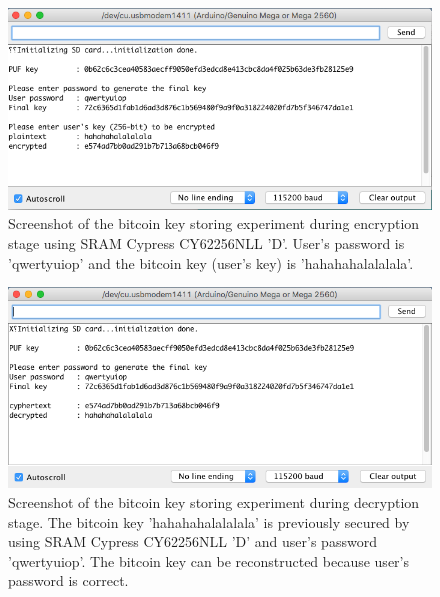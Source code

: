 \begin{figure}[tph!]
    \centerline{\includegraphics[width={\textwidth}]{images/D_encrypt}}
    \caption{Screenshot of the bitcoin key storing experiment during encryption stage using SRAM Cypress CY62256NLL 'D'.
    User's password is 'qwertyuiop' and the bitcoin key (user's key) is 'hahahahalalalala'.}
    \label{fig:D_encrypt}
\end{figure}

\begin{figure}[tph!]
    \centerline{\includegraphics[width={\textwidth}]{images/D_decrypt_correct}}
    \caption{Screenshot of the bitcoin key storing experiment during decryption stage. The bitcoin key 'hahahahalalalala' is previously secured by using SRAM Cypress CY62256NLL 'D' and user's password 'qwertyuiop'.
    The bitcoin key can be reconstructed because user's password is correct.}
    \label{fig:D_decrypt_correct}
\end{figure}


